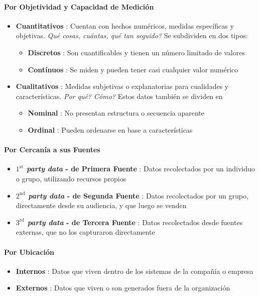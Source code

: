 \paragraph{Por Objetividad y Capacidad de Medición}
\begin{itemize}
    \item{\textbf{Cuantitativos} : Cuentan con hechos numéricos, medidas específicas y objetivas. \textit{Qué cosas, cuántas, qué tan seguido?} Se subdividen en dos tipos:
    \begin{itemize}
        \item{\textbf{Discretos} : Son cuantificables y tienen un número limitado de valores}
        \item{\textbf{Contínuos} : Se miden y pueden tener casi cualquier valor numérico}
    \end{itemize}}
    \item{\textbf{Cualitativos} : Medidas subjetivas o explanatorias para cualidades y características. \textit{Por qué? Cómo?} Estos datos también se dividen en
    \begin{itemize}
        \item{\textbf{Nominal} : No presentan estructura o secuencia aparente}
        \item{\textbf{Ordinal} : Pueden ordenarse en base a características}
    \end{itemize}}
\end{itemize}

\paragraph{Por Cercanía a sus Fuentes}
\begin{itemize}
    \item {\textbf{\textit{$1^{\text{st}}$ party data} - de Primera Fuente} : Datos recolectados por un individuo o grupo, utilizando recursos propios}
    \item {\textbf{\textit{$2^{\text{nd}}$ party data} - de Segunda Fuente} : Datos recolectados por un grupo, directamente desde su audiencia, y que luego se venden}
    \item {\textbf{\textit{$3^{\text{rd}}$ party data} - de Tercera Fuente} : Datos recolectados desde fuentes externas, que no los capturaron directamente}
\end{itemize}

\paragraph{Por Ubicación}
\begin{itemize}
    \item {\textbf{Internos} : Datos que viven dentro de los sistemas de la compañía o empresa}
    \item {\textbf{Externos} : Datos que viven o son generados fuera de la organización}
\end{itemize}

